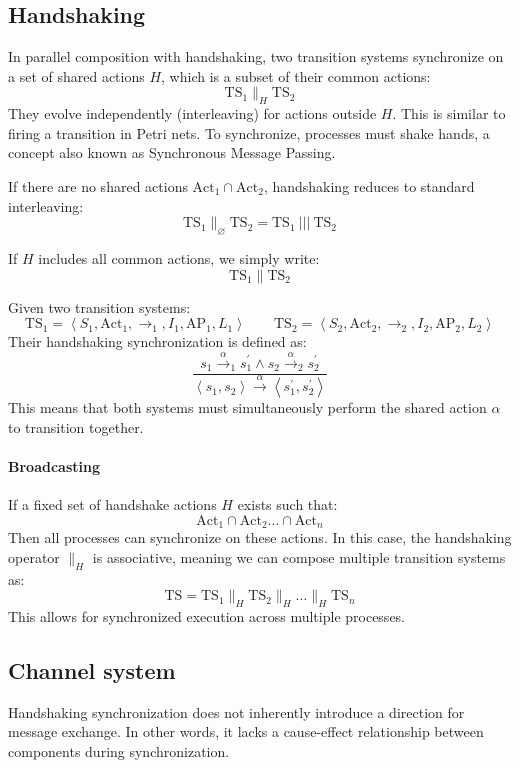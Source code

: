 \subsection{Handshaking}
In parallel composition with handshaking, two transition systems synchronize on a set of shared actions $H$, which is a subset of their common actions:
\[\text{TS}_1 \parallel_H \text{TS}_2\]    
They evolve independently (interleaving) for actions outside $H$.
This is similar to firing a transition in Petri nets.
To synchronize, processes must shake hands, a concept also known as Synchronous Message Passing.

If there are no shared actions $\text{Act}_1\cap \text{Act}_2$, handshaking reduces to standard interleaving:
\[\text{TS}_1\parallel_{\varnothing}\text{TS}_2=\text{TS}_1\:|||\:\text{TS}_2\]

If $H$ includes all common actions, we simply write:
\[\text{TS}_1\parallel\text{TS}_2\]

Given two transition systems:
\[\text{TS}_1=\left\langle S_1, \text{Act}_1, \rightarrow_1, I_1,\text{AP}_1, L_1\right\rangle \qquad \text{TS}_2=\left\langle S_2, \text{Act}_2, \rightarrow_2, I_2,\text{AP}_2, L_2\right\rangle\]    
Their handshaking synchronization is defined as: 
\[\dfrac{s_1\overset{\alpha}{\rightarrow}_1s_1^\prime\land s_2\overset{\alpha}{\rightarrow}_2s_2^\prime}{\left\langle s_1,s_2\right\rangle \overset{\alpha}{\rightarrow}\left\langle s_1^\prime,s_2^\prime\right\rangle}\]
This means that both systems must simultaneously perform the shared action $\alpha$ to transition together.

\paragraph*{Broadcasting}
If a fixed set of handshake actions $H$ exists such that: 
\[\text{Act}_1\cap \text{Act}_2 \dots \cap \text{Act}_n\]
Then all processes can synchronize on these actions.
In this case, the handshaking operator $\parallel_H$ is associative, meaning we can compose multiple transition systems as:
\[\text{TS}=\text{TS}_1\parallel_H\text{TS}_2\parallel_H\dots \parallel_H\text{TS}_n\]
This allows for synchronized execution across multiple processes.

\subsection{Channel system}
Handshaking synchronization does not inherently introduce a direction for message exchange. 
In other words, it lacks a cause-effect relationship between components during synchronization.

